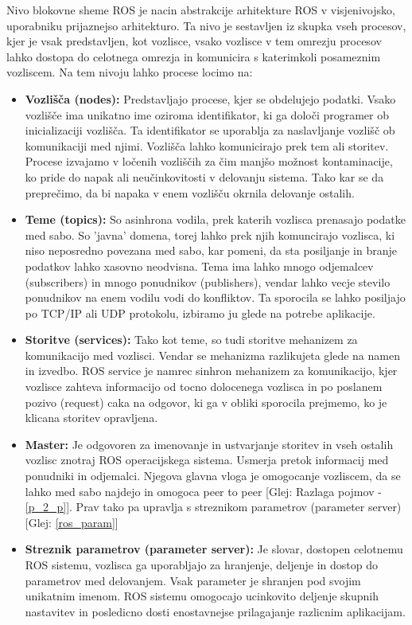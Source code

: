 \documentclass[a4paper,twoside,openright,12pt,slovene]{book}
\begin{document}
\begin{enumerate}
 Nivo blokovne sheme ROS je nacin abstrakcije arhitekture ROS v visjenivojsko, uporabniku prijaznejso arhitekturo. Ta nivo je sestavljen iz skupka vseh procesov, kjer je vsak predstavljen, kot vozlisce, vsako vozlisce v tem omrezju procesov lahko dostopa do celotnega omrezja in komunicira s katerimkoli posameznim vozliscem. Na tem nivoju lahko procese locimo na:
    \begin{itemize}
        \item \label{ros_node}\textbf{Vozlišča (nodes):} Predstavljajo procese, kjer se obdelujejo podatki. Vsako vozlišče ima unikatno ime oziroma identifikator, ki ga določi programer ob inicializaciji vozlišča. Ta identifikator se uporablja za naslavljanje vozlišč ob komunikaciji med njimi. Vozlišča lahko komunicirajo prek tem ali storitev. Procese izvajamo v ločenih vozliščih za čim manjšo možnost kontaminacije, ko pride do napak ali neučinkovitosti v delovanju sistema. Tako kar se da preprečimo, da bi napaka v enem vozlišču okrnila delovanje ostalih.

        \item \label{ros_topic} \textbf{Teme (topics):} So asinhrona vodila, prek katerih vozlisca prenasajo podatke med sabo. So 'javna' domena, torej lahko prek njih komuncirajo vozlisca, ki niso neposredno povezana med sabo, kar pomeni, da sta posiljanje in branje podatkov lahko xasovno neodvisna. Tema ima lahko mnogo odjemalcev (subscribers) in mnogo ponudnikov (publishers), vendar lahko vecje stevilo ponudnikov na enem vodilu vodi do konfliktov. Ta sporocila se lahko posiljajo po TCP/IP ali UDP protokolu, izbiramo ju glede na potrebe aplikacije.

        \item \label{ros_service} \textbf{Storitve (services):} Tako kot teme, so tudi storitve mehanizem za komunikacijo med vozlisci. Vendar se mehanizma razlikujeta glede na namen in izvedbo. ROS service je namrec sinhron mehanizem za komunikacijo, kjer vozlisce zahteva informacijo od tocno dolocenega vozlisca in po poslanem pozivo (request) caka na odgovor, ki ga v obliki sporocila prejmemo, ko je klicana storitev opravljena.

        \item \label{ros_master} \textbf{Master:} Je odgovoren za imenovanje in ustvarjanje storitev in vseh ostalih vozlisc znotraj ROS operacijskega sistema. Usmerja pretok informacij med ponudniki in odjemalci. Njegova glavna vloga je omogocanje vozliscem, da se lahko med sabo najdejo in omogoca peer to peer [Glej: Razlaga pojmov - \ref{p_2_p}]. Prav tako pa upravlja s streznikom parametrov (parameter server) [Glej: \ref{ros_param}]

        \item \label{ros_param} \textbf{Streznik parametrov (parameter server):} Je slovar, dostopen celotnemu ROS sistemu, vozlisca ga uporabljajo za hranjenje, deljenje in dostop do parametrov med delovanjem. Vsak parameter je shranjen pod svojim unikatnim imenom. ROS sistemu omogocajo ucinkovito deljenje skupnih nastavitev in posledicno dosti enostavnejse prilagajanje razlicnim aplikacijam.
    \end{itemize}
\end{enumerate}
\end{document}
